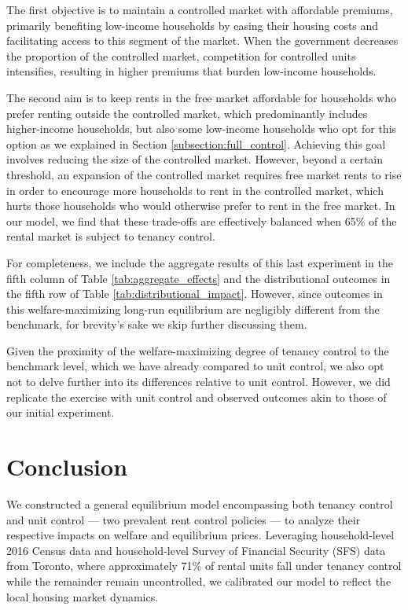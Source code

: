 \documentclass[parskip=full]{article}
\begin{document}
The first objective is to maintain a controlled market with affordable premiums, primarily benefiting low-income households by easing their housing costs and facilitating access to this segment of the market. When the government decreases the proportion of the controlled market, competition for controlled units intensifies, resulting in higher premiums that burden low-income households.

The second aim is to keep rents in the free market affordable for households who prefer renting outside the controlled market, which predominantly includes higher-income households, but also some low-income households who opt for this option as we explained in Section \ref{subsection:full_control}. Achieving this goal involves reducing the size of the controlled market. However, beyond a certain threshold, an expansion of the controlled market requires free market rents to rise in order to encourage more households to rent in the controlled market, which hurts those households who would otherwise prefer to rent in the free market. In our model, we find that these trade-offs are effectively balanced when 65\% of the rental market is subject to tenancy control.

For completeness, we include the aggregate results of this last experiment in the fifth column of Table \ref{tab:aggregate_effects} and the distributional outcomes in the fifth row of Table \ref{tab:distributional_impact}. However, since outcomes in this welfare-maximizing long-run equilibrium are negligibly different from the benchmark, for brevity's sake we skip further discussing them.

Given the proximity of the welfare-maximizing degree of tenancy control to the benchmark level, which we have already compared to unit control, we also opt not to delve further into its differences relative to unit control. However, we did replicate the exercise with unit control and observed outcomes akin to those of our initial experiment.

\section{Conclusion}\label{sec:conclusion}

We constructed a general equilibrium model encompassing both tenancy control and unit control --- two prevalent rent control policies --- to analyze their respective impacts on welfare and equilibrium prices. Leveraging household-level 2016 Census data and household-level Survey of Financial Security (SFS) data from Toronto, where approximately 71\% of rental units fall under tenancy control while the remainder remain uncontrolled, we calibrated our model to reflect the local housing market dynamics.
\end{document}
